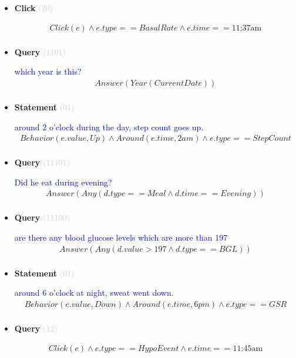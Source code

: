 \documentclass[11pt]{article}
\newcommand{\key}[1]{\textcolor{lightgray}{#1}}
\newcounter{CQuery}
\newcounter{CStatement}
\newcounter{CClick}
\begin{document}
\begin{itemize}
\item
\textbf{Click\theCClick} \key{(20)} \addtocounter{CClick}{1}
\textcolor{blue}{  }
\begin{multline*}
Click(e) \wedge e.type==BasalRate \wedge e.time==\mbox{11:37am} \\ 
\end{multline*}


\item
\textbf{Query\theCQuery} \key{(1101)} \addtocounter{CQuery}{1}
\textcolor{blue}{ which year is this? }
\begin{multline*}
Answer(Year(CurrentDate)) \\ 
\end{multline*}


\item
\textbf{Statement\theCStatement} \key{(01)} \addtocounter{CStatement}{1}
\textcolor{blue}{ around 2 o'clock during the day, step count goes up. }
\begin{multline*}
Behavior(e.value, Up) \wedge Around(e.time, 2am) \wedge e.type==StepCount \\ 
\end{multline*}


\item
\textbf{Query\theCQuery} \key{(11101)} \addtocounter{CQuery}{1}
\textcolor{blue}{ Did he eat during evening? }
\begin{multline*}
Answer(Any(d.type==Meal \wedge d.time==Evening)) \\ 
\end{multline*}


\item
\textbf{Query\theCQuery} \key{(11100)} \addtocounter{CQuery}{1}
\textcolor{blue}{ are there any blood glucose levels which are more than 197 }
\begin{multline*}
Answer(Any(d.value>197 \wedge d.type==BGL)) \\ 
\end{multline*}


\item
\textbf{Statement\theCStatement} \key{(01)} \addtocounter{CStatement}{1}
\textcolor{blue}{ around 6 o'clock at night, sweat went down. }
\begin{multline*}
Behavior(e.value, Down) \wedge Around(e.time, 6pm) \wedge e.type==GSR \\ 
\end{multline*}


\item
\textbf{Query\theCQuery} \key{(12)} \addtocounter{CQuery}{1}
\textcolor{blue}{  }
\begin{multline*}
Click(e) \wedge e.type == HypoEvent \wedge e.time == \mbox{11:45am} \\ 
\end{multline*}



\end{itemize}
\end{document}
